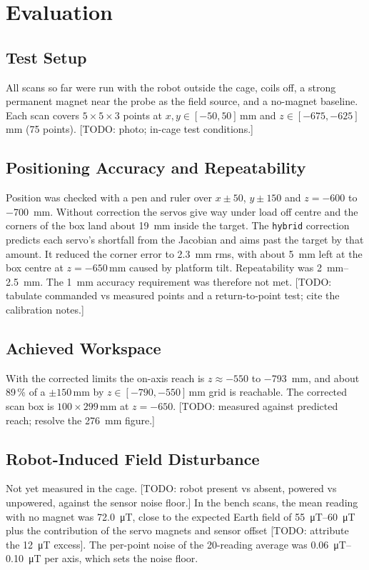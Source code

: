 \documentclass[conference]{IEEEtran}
\begin{document}
\section{Evaluation}
\subsection{Test Setup}
All scans so far were run with the robot outside the cage, coils off, a strong
permanent magnet near the probe as the field source, and a no-magnet baseline.
Each scan covers $5\times5\times3$ points at $x,y\in[-50,50]$\,mm and
$z\in[-675,-625]$\,mm (75 points). [TODO: photo; in-cage test conditions.]

\subsection{Positioning Accuracy and Repeatability}
Position was checked with a pen and ruler over $x\pm50$, $y\pm150$ and
$z=-600$ to \SI{-700}{mm}. Without correction the servos give way under load off
centre and the corners of the box land about \SI{19}{mm} inside the target. The
\texttt{hybrid} correction predicts each servo's shortfall from the Jacobian and aims
past the target by that amount. It reduced the corner error to \SI{2.3}{mm} rms,
with about \SI{5}{mm} left at the box centre at $z=-650$\,mm caused by platform tilt.
Repeatability was \SIrange{2}{2.5}{mm}. The \SI{1}{mm} accuracy requirement was
therefore not met. [TODO: tabulate commanded vs measured points and a return-to-point
test; cite the calibration notes.]

\subsection{Achieved Workspace}
With the corrected limits the on-axis reach is $z\approx-550$ to \SI{-793}{mm}, and
about 89\,\% of a $\pm150$\,mm by $z\in[-790,-550]$\,mm grid is reachable. The
corrected scan box is $100\times299$\,mm at $z=-650$. [TODO: measured against
predicted reach; resolve the \SI{276}{mm} figure.]

\subsection{Robot-Induced Field Disturbance}
Not yet measured in the cage. [TODO: robot present vs absent, powered vs unpowered,
against the sensor noise floor.] In the bench scans, the mean reading with no magnet
was \SI{72.0}{\micro T}, close to the expected Earth field of \SIrange{55}{60}{\micro T}
plus the contribution of the servo magnets and sensor offset [TODO: attribute the
\SI{12}{\micro T} excess]. The per-point noise of the 20-reading average was
\SIrange{0.06}{0.10}{\micro T} per axis, which sets the noise floor.
\end{document}
